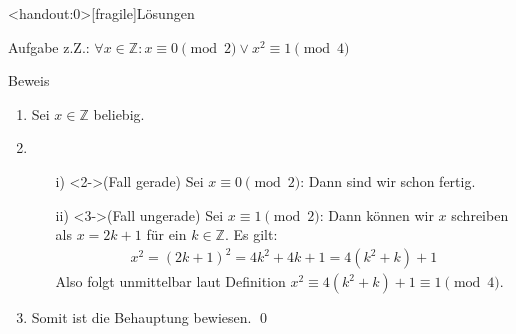 {
\begin{frame}<handout:0>[fragile]{Lösungen}
	\begin{alertblock}{Aufgabe}
		z.Z.: $\forall x \in \mathbb{Z}: x \equiv 0 \pmod{2} \vee x^2 \equiv 1 \pmod{4}$
	\end{alertblock}
	\begin{alertblock}{Beweis}
		\begin{enumerate}
			\item<1-> Sei $x \in \mathbb{Z}$ beliebig.
			\item<2->
			      \begin{enumerate}
				      \item[i)]<2->(Fall gerade)\phantom{un} Sei $x \equiv 0 \pmod{2}$: Dann sind wir schon fertig.
				      \item[ii)]<3->(Fall ungerade) Sei $x \equiv 1 \pmod{2}$: Dann können wir $x$ schreiben als $x = 2k + 1$ für ein $k \in \mathbb{Z}$.
				            Es gilt:
				            \begin{align*}
					            x^2 = (2k+1)^2 = 4k^2 + 4k + 1 = 4(k^2 + k) + 1
				            \end{align*}
				            Also folgt unmittelbar laut Definition $x^2 \equiv 4(k^2 + k) + 1 \equiv 1 \pmod{4}$.
			      \end{enumerate}
			\item<4-> Somit ist die Behauptung bewiesen. \qed
		\end{enumerate}
	\end{alertblock}
\end{frame}
}